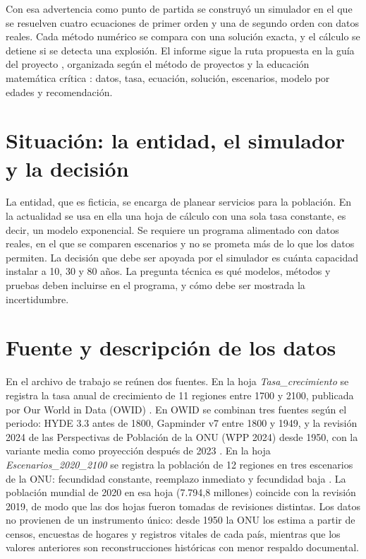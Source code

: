 \documentclass[10pt,twocolumn,letterpaper]{article}
\begin{document}
Con esa advertencia como punto de partida se construyó un simulador en el que se resuelven cuatro ecuaciones de primer orden y una de segundo orden con datos reales. Cada método numérico se compara con una solución exacta, y el cálculo se detiene si se detecta una explosión. El informe sigue la ruta propuesta en la guía del proyecto \cite{guia}, organizada según el método de proyectos \cite{kilpatrick,dewey} y la educación matemática crítica \cite{skovsmose}: datos, tasa, ecuación, solución, escenarios, modelo por edades y recomendación.

\section{Situación: la entidad, el simulador y la decisión}
La entidad, que es ficticia, se encarga de planear servicios para la población. En la actualidad se usa en ella una hoja de cálculo con una sola tasa constante, es decir, un modelo exponencial. Se requiere un programa alimentado con datos reales, en el que se comparen escenarios y no se prometa más de lo que los datos permiten. La decisión que debe ser apoyada por el simulador es cuánta capacidad instalar a 10, 30 y 80 años. La pregunta técnica es qué modelos, métodos y pruebas deben incluirse en el programa, y cómo debe ser mostrada la incertidumbre.

\section{Fuente y descripción de los datos}
En el archivo de trabajo se reúnen dos fuentes. En la hoja \textit{Tasa\_crecimiento} se registra la tasa anual de crecimiento de 11 regiones entre 1700 y 2100, publicada por Our World in Data (OWID) \cite{owid}. En OWID se combinan tres fuentes según el periodo: HYDE 3.3 antes de 1800, Gapminder v7 entre 1800 y 1949, y la revisión 2024 de las Perspectivas de Población de la ONU (WPP 2024) desde 1950, con la variante media como proyección después de 2023 \cite{owid}. En la hoja \textit{Escenarios\_2020\_2100} se registra la población de 12 regiones en tres escenarios de la ONU: fecundidad constante, reemplazo inmediato y fecundidad baja \cite{wpp}. La población mundial de 2020 en esa hoja (7.794,8 millones) coincide con la revisión 2019, de modo que las dos hojas fueron tomadas de revisiones distintas. Los datos no provienen de un instrumento único: desde 1950 la ONU los estima a partir de censos, encuestas de hogares y registros vitales de cada país, mientras que los valores anteriores son reconstrucciones históricas con menor respaldo documental.
\end{document}
